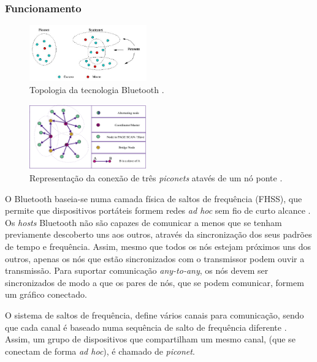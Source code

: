 \documentclass[conference]{IEEEtran}
\begin{document}
\subsubsection{Funcionamento}

\begin{figure}[!t]
  \centering
  \includegraphics[width=0.45\textwidth]{Esquema_Bluetooth.png}
  \caption{Topologia da tecnologia Bluetooth \cite{blueesptec}.}
  \label{fig:topBluet}
\end{figure}

\begin{figure}[!t]
  \centering
  \includegraphics[width=0.45\textwidth]{no_ponte.png}
  \caption{Representação da conexão de três \textit{piconets} atavés de um nó ponte \cite{salonidis2005distributed}.}
  \label{fig:noPonte}
\end{figure}

O Bluetooth baseia-se numa camada física de saltos de frequência (FHSS), que permite que dispositivos portáteis formem redes \textit{ad hoc} sem fio de curto alcance \cite{salonidis2005distributed}. 
Os \textit{hosts} Bluetooth não são capazes de comunicar a menos que se tenham previamente descoberto uns aos outros, através da sincronização dos seus padrões de tempo e frequência. 
Assim, mesmo que todos os nós estejam próximos uns dos outros, apenas os nós que estão sincronizados com o transmissor podem ouvir a transmissão.
Para suportar comunicação \textit{any-to-any}, os nós devem ser sincronizados de modo a que os pares de nós, que se podem comunicar, formem um gráfico conectado.

O sistema de saltos de frequência, define vários canais para comunicação, sendo que cada canal é baseado numa sequência de salto de frequência diferente \cite{salonidis2005distributed}. 
Assim, um grupo de dispositivos que compartilham um mesmo canal, (que se conectam de forma \textit{ad hoc}), é chamado de \textit{piconet}. 
\end{document}
